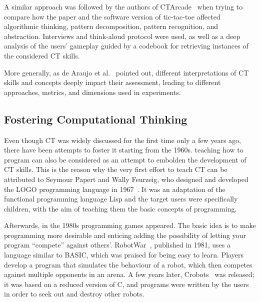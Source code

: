 A similar approach was followed by the authors of CTArcade~\cite{Lee:2014er} when trying to compare how the paper and the software version of tic-tac-toe affected algorithmic thinking, pattern decomposition, pattern recognition, and abstraction. Interviews and think-aloud protocol were used, as well as a deep analysis of the users’ gameplay guided by a codebook for retrieving instances of the considered \ac{CT} skills.

More generally, as de Araujo et al.~\cite{de2016systematic} pointed out, different interpretations of \ac{CT} skills and concepts deeply impact their assessment, leading to different approaches, metrics, and dimensions used in experiments.

\subsection{Fostering Computational Thinking}
Even though \ac{CT} was widely discussed for the first time only a few years ago, there have been attempts to foster it starting from the 1960s.  teaching how to program can also be considered as an attempt to embolden the development of \ac{CT} skills. This is the reason why the very first effort to teach \ac{CT} can be attributed to Seymour Papert and Wally Feurzeig, who designed and developed the LOGO programming language in 1967~\cite{chakraborty1999logo}. It was an adaptation of the functional programming language Lisp and the target users were specifically children, with the aim of teaching them the basic concepts of programming.

Afterwards, in the 1980s programming games appeared. The basic idea is to make programming more desirable and enticing adding the possibility of letting your program ``compete'' against others’. RobotWar~\cite{ROBOTWAR}, published in 1981, uses a language similar to BASIC, which was praised for being easy to learn. Players develop a program that simulates the behaviour of a robot, which then competes against multiple opponents in an arena. A few years later, Crobots~\cite{CROBOTS} was released; it was based on a reduced version of C, and programs were written by the users in order to seek out and destroy other robots.


